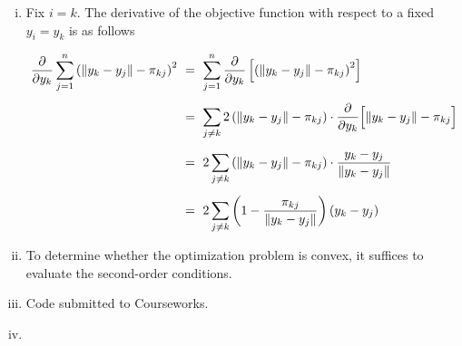 \documentclass[twoside,11pt]{homework}
\DeclarePairedDelimiter{\2norm}{\lVert}{\rVert^2_2}
\newcommand{\1}[1]{\mathds{1}\left[#1\right]}
\DeclarePairedDelimiter{\norm}{\lVert}{\rVert}
\begin{document}
\begin{enumerate}[(i)]

\item Fix $i = k$. The derivative of the objective function with respect to a fixed $y_i = y_k$ is as follows

\begin{align*}
\frac{\partial}{\partial y_k}\sum_{j=1}^n\left(\norm{y_k - y_j} - \pi_{kj}\right)^2 \ &= \ \sum_{j=1}^n\frac{\partial}{\partial y_k}\left[\left(\norm{y_k - y_j} - \pi_{kj}\right)^2\right]\\[0.5em]
&= \ \sum_{j \neq k} 2\left(\norm{y_k - y_j} - \pi_{kj}\right) \cdot \frac{\partial}{\partial y_k}\Big[\norm{y_k - y_j} - \pi_{kj}\Big]\\[0.5em]
&= \ 2\sum_{j \neq k}\left(\norm{y_k - y_j} - \pi_{kj}\right) \cdot \frac{y_k - y_j}{\norm{y_k - y_j}}\\[0.5em]
&= \ 2\sum_{j \neq k}\left(1 - \frac{\pi_{kj}}{\norm{y_k - y_j}} \right) (y_k - y_j)
\end{align*}


\item To determine whether the optimization problem is convex, it suffices to evaluate the second-order conditions. 


\item Code submitted to Courseworks.


\item 


\end{enumerate}
\end{document}
